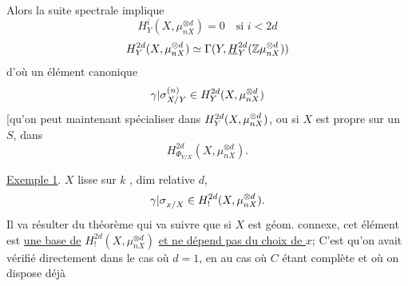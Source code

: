 Alors la suite spectrale implique
\[
H^i_Y(X,\mu_{nX}^{\otimes d})=0\quad\text{si }i<2d
\]
\[
H^{2d}_Y(X,\mu_{nX}^{\otimes d})\simeq
\Gamma(Y,\underline H^{2d}_Y({{\mathbb Z}}\mu_{nX}^{\otimes d}))
\]
d'où un  élément canonique
\[
{\gamma|\sigma}^{(n)}_{X/Y}\in H^{2d}_Y(X,\mu_{nX}^{\otimes d})
\]
[qu'on peut maintenant spécialiser dans
$H^{2d}_{{{Y}}}(X,\mu_{nX}^{\otimes d})$, ou si
$X$ est propre sur un $S$, dans
\[
H^{2d}_{\Phi_{Y/X}}(X,\mu_{nX}^{\otimes d}).
\]

\uline{Exemple 1}. $X$ lisse sur $k$ ,
 dim relative $d$,
\[
{\gamma|\sigma}_{x/X}\in H^{2d}_!(X,\mu_{nX}^{\otimes d}).
\]
Il va résulter du théorème qui va suivre que 
si $X$ est géom. connexe, cet élément est
\uline{une base de} $H^{2d}_!(X,\mu_{nX}^{\otimes d})$
\uline{et ne dépend pas du choix de $x$};
 C'est qu'on avait vérifié directement dans le cas où
$d=1$, en  
au cas où $C$ étant complète et où on dispose déjà
